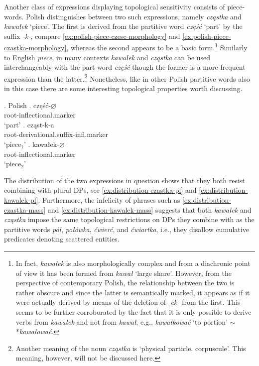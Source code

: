 Another class of expressions displaying topological sensitivity consists of piece-words. Polish distinguishes between two such expressions, namely \textit{cząstka} and \textit{kawałek} `piece'. The first  is derived from the partitive word \textit{część} `part' by the suffix \textit{-k-}, compare \ref{ex:polish-piece-czesc-morphology} and \ref{ex:polish-piece-czastka-morphology}, whereas the second appears to be a basic form.\footnote{In fact, \textit{kawałek} is also morphologically complex and from a diachronic point of view it has been formed from \textit{kawał} `large share'. However, from the perspective of contemporary Polish, the relationship between the two is rather obscure and since the latter is semantically marked, it appears as if it were actually derived by means of the deletion of \textit{-ek-} from the first. This seems to be further corroborated by the fact that it is only possible to derive verbs from \textit{kawałek} and not from \textit{kawał}, e.g., \textit{kawałkować} `to portion' $\sim$ *\textit{kawałować}.} Similarly to English \textit{piece}, in many contexts \textit{kawałek} and \textit{cząstka} can be used interchangeably with the part-word \textit{część} though the former is a more frequent expression than the latter.\footnote{Another meaning of the noun \textit{cząstka} is `physical particle, corpuscule'. This meaning, however, will not be discussed here.} Nonetheless, like in other Polish partitive words also in this case there are some interesting topological properties worth discussing.\largerpage 
		
		\ex. Polish\label{ex:polish-piece-words-morphology}
        \ag. część-$\varnothing$\label{ex:polish-piece-czesc-morphology}\\
        root-inflectional.marker\\
        `part'
        \bg. cząst-k-a\label{ex:polish-piece-czastka-morphology}\\
		root-derivational.suffix-infl.marker\\
        `piece$_1$'
        \bg. kawałek-$\varnothing$\label{ex:polish-piece-kawalek-morphology}\\
        root-inflectional.marker\\
        `piece$_2$'

The distribution of the two expressions in question shows that they both resist combining with plural DPs, see \ref{ex:distribution-czastka-pl} and \ref{ex:distribution-kawalek-pl}. Furthermore, the infelicity of phrases such as \ref{ex:distribution-czastka-mass} and \ref{ex:distribution-kawalek-mass} suggests that both \textit{kawałek} and \textit{cząstka} impose the same topological restrictions on DPs they combine with as the partitive words \textit{pół}, \textit{połówka}, \textit{ćwierć}, and \textit{ćwiartka}, i.e., they disallow cumulative predicates denoting scattered entities.

